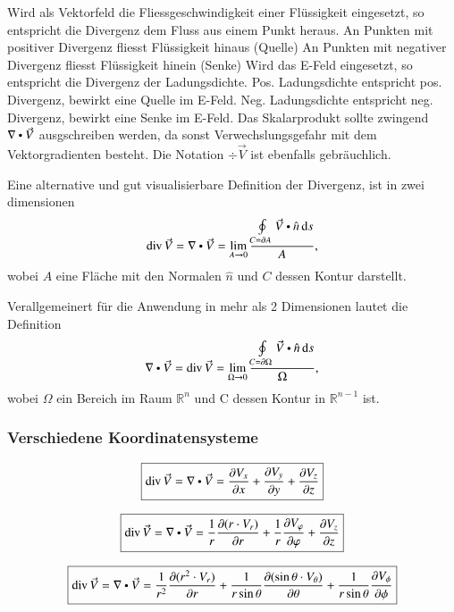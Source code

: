 \medskip
\begin{outline}
    \1 Wird als Vektorfeld die Fliessgeschwindigkeit einer Flüssigkeit eingesetzt, so entspricht die Divergenz dem Fluss aus einem Punkt heraus.
        \2 An Punkten mit positiver Divergenz fliesst Flüssigkeit hinaus (Quelle)
        \2 An Punkten mit negativer Divergenz fliesst Flüssigkeit hinein (Senke)
    \1 Wird das E-Feld eingesetzt, so entspricht die Divergenz der Ladungsdichte.
        \2 Pos. Ladungsdichte entspricht pos. Divergenz, bewirkt eine Quelle im E-Feld.
        \2 Neg. Ladungsdichte entspricht neg. Divergenz, bewirkt eine Senke im E-Feld.
    \1 Das Skalarprodukt sollte zwingend $\nabla \dotp \vec{V}$ ausgschreiben werden, da sonst Verwechslungsgefahr mit dem Vektorgradienten besteht.
    \1 Die Notation $ \div \vec{V}$ ist ebenfalls gebräuchlich.
\end{outline}

\medskip
Eine alternative und gut visualisierbare Definition der Divergenz, ist in zwei dimensionen
\[
    \div \vec{V} = \nabla\dotp\vec{V}  = \lim_{A \to 0}\frac{\oint\limits_{C = \partial A} \vec{V} \dotp \hat{n} \diff s}{A},
\]
wobei $A$ eine Fläche mit den Normalen $\hat{n}$ und $C$ dessen Kontur darstellt.

Verallgemeinert für die Anwendung in mehr als 2 Dimensionen lautet die Definition
\[
    \nabla\dotp\vec{V} = \div \vec{V} = \lim_{\Omega \to 0}\frac{\oint\limits_{C = \partial \Omega}\vec{V} \dotp \hat{n} \diff s}{\Omega},
\]
wobei $\Omega$ ein Bereich im Raum $\mathbb{R}^n$ und C dessen Kontur in $\mathbb{R}^{n-1}$ ist.

\subsubsection{Verschiedene Koordinatensysteme}
\[
    \boxed{
        \div \vec{V}
        = \nabla \dotp \vec{V}
        = \frac{\partial V_x}{\partial x} + \frac{\partial V_y}{\partial y} + \frac{\partial V_z}{\partial z}
    }
\]

\[
    \boxed{
        \div \vec{V}
        = \nabla \dotp \vec{V}
        = \frac{1}{r} \frac{\partial (r \cdot V_r)}{\partial r} + \frac{1}{r} \frac{\partial V_\varphi}{\partial \varphi} + \frac{\partial V_z}{\partial z}
    }
\]

\[
    \boxed{
        \div \vec{V}
        = \nabla \dotp \vec{V}
        = \frac{1}{r^2} \frac{\partial (r^2 \cdot V_r)}{\partial r} + \frac{1}{r \sin \theta} \frac{\partial (\sin \theta \cdot V_\theta)}{\partial \theta} + \frac{1}{r \sin \theta} \frac{\partial V_\phi}{\partial \phi}
    }
\]


